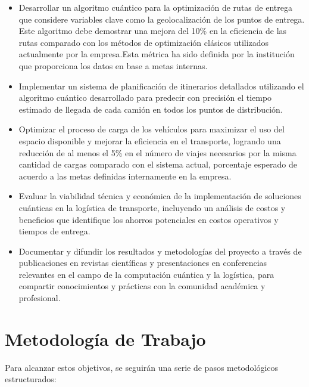 \documentclass[11pt,a4paper,spanish]{book}
\begin{document}
\begin{itemize}
    \item Desarrollar un algoritmo cuántico para la optimización de rutas de entrega que considere variables clave como la geolocalización de los puntos de entrega. Este algoritmo debe demostrar una mejora del 10\% en la eficiencia de las rutas comparado con los métodos de optimización clásicos utilizados actualmente por la empresa.Esta métrica ha sido definida por la institución que proporciona los datos en base a metas internas.

    \item Implementar un sistema de planificación de itinerarios detallados utilizando el algoritmo cuántico desarrollado para predecir con precisión el tiempo estimado de llegada de cada camión en todos los puntos de distribución.

    \item Optimizar el proceso de carga de los vehículos para maximizar el uso del espacio disponible y mejorar la eficiencia en el transporte, logrando una reducción de al menos el 5\% en el número de viajes necesarios por la misma cantidad de cargas comparado con el sistema actual, porcentaje esperado de acuerdo a las metas definidas internamente en la empresa.

    \item Evaluar la viabilidad técnica y económica de la implementación de soluciones cuánticas en la logística de transporte, incluyendo un análisis de costos y beneficios que identifique los ahorros potenciales en costos operativos y tiempos de entrega.

    \item Documentar y difundir los resultados y metodologías del proyecto a través de publicaciones en revistas científicas y presentaciones en conferencias relevantes en el campo de la computación cuántica y la logística, para compartir conocimientos y prácticas con la comunidad académica y profesional.

\end{itemize}

\section{Metodología de Trabajo}

Para alcanzar estos objetivos, se seguirán una serie de pasos metodológicos estructurados:
\end{document}
